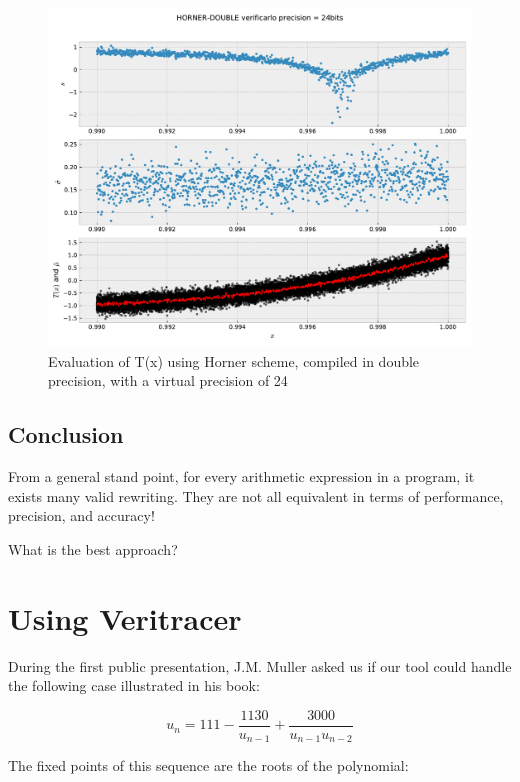 \documentclass{TP}
\begin{document}
\begin{figure}[h]
  \center \includegraphics[width=.8\textwidth]{HORNER-DOUBLE-24-zoom.pdf}
  \caption{Evaluation of T(x) using Horner scheme, compiled in double precision,
    with a virtual precision of 24}
    \label{fig:horner:double:24:zoom}
\end{figure}

\subsection{Conclusion}


From a general stand point, for every arithmetic expression in a program, it exists many valid rewriting. They are not all equivalent in terms of performance, precision, and accuracy!

\begin{question}
What is the best approach?
\end{question}

\FloatBarrier

\section{Using Veritracer}

During the first public presentation, J.M. Muller asked us if our tool could handle the following case illustrated in his book:

 \begin{equation}
   u_{n} = 111 - \dfrac{1130}{u_{n-1}} + \dfrac{3000}{u_{n-1}u_{n-2}}
   \label{eq:muller_sequence_un}
 \end{equation}

The fixed points of this sequence are the roots of the polynomial:
\end{document}
